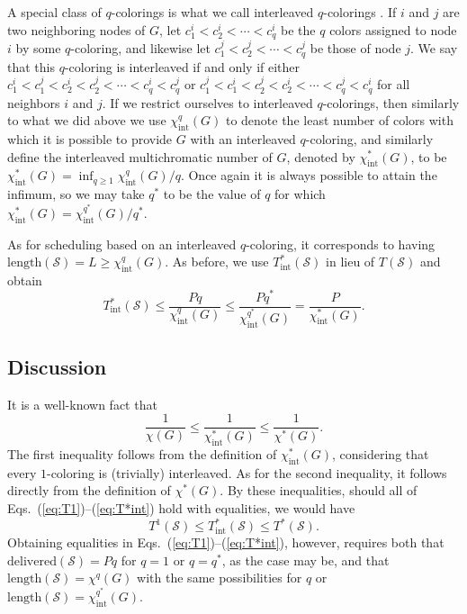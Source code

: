 \documentclass{article}
\begin{document}
A special class of $q$-colorings is what we call interleaved $q$-colorings
\cite{bg89,b00,yz05}. If $i$ and $j$ are two neighboring nodes of $G$, let
$c^i_1<c^i_2<\cdots<c^i_q$ be the $q$ colors assigned to node $i$ by some
$q$-coloring, and likewise let $c^j_1<c^j_2<\cdots<c^j_q$ be those of node $j$.
We say that this $q$-coloring is interleaved if and only if either
$c^i_1<c^j_1<c^i_2<c^j_2<\cdots<c^i_q<c^j_q$ or
$c^j_1<c^i_1<c^j_2<c^i_2<\cdots<c^j_q<c^i_q$ for all neighbors $i$ and $j$. If
we restrict ourselves to interleaved $q$-colorings, then similarly to what we
did above we use $\chi^q_\mathrm{int}(G)$ to denote the least number of colors
with which it is possible to provide $G$ with an interleaved $q$-coloring, and
similarly define the interleaved multichromatic number of $G$, denoted by
$\chi^*_\mathrm{int}(G)$, to be
$\chi^*_\mathrm{int}(G)=\inf_{q\ge 1}\chi^q_\mathrm{int}(G)/q$. Once again it is
always possible to attain the infimum, so we may take $q^*$ to be the value of
$q$ for which $\chi^*_\mathrm{int}(G)=\chi^{q^*}_\mathrm{int}(G)/q^*$.

As for scheduling based on an interleaved $q$-coloring, it corresponds to having
$\mathrm{length}(\mathcal{S})=L\ge\chi^q_\mathrm{int}(G)$. As before, we use
$T^*_\mathrm{int}(\mathcal{S})$ in lieu of $T(\mathcal{S})$ and obtain
\begin{equation}
T^*_\mathrm{int}(\mathcal{S})\le
\frac{Pq}{\chi^q_\mathrm{int}(G)}\le
\frac{Pq^*}{\chi^{q^*}_\mathrm{int}(G)}=
\frac{P}{\chi^*_\mathrm{int}(G)}.
\label{eq:T*int}
\end{equation}

\subsection{Discussion}

It is a well-known fact that
\begin{equation}
\frac{1}{\chi(G)}\le
\frac{1}{\chi^*_\mathrm{int}(G)}\le
\frac{1}{\chi^*(G)}.
\label{eq:ineq-chi}
\end{equation}
The first inequality follows from the definition of $\chi^*_\mathrm{int}(G)$,
considering that every $1$-coloring is (trivially) interleaved. As for the
second inequality, it follows directly from the definition of $\chi^*(G)$. By
these inequalities, should all of Eqs.~(\ref{eq:T1})--(\ref{eq:T*int}) hold with
equalities, we would have
\begin{equation}
T^1(\mathcal{S})\le
T^*_\mathrm{int}(\mathcal{S})\le
T^*(\mathcal{S}).
\end{equation}
Obtaining equalities in Eqs.~(\ref{eq:T1})--(\ref{eq:T*int}), however, requires
both that $\mathrm{delivered}(\mathcal{S})=Pq$ for $q=1$ or $q=q^*$, as the
case may be, and that $\mathrm{length}(\mathcal{S})=\chi^q(G)$ with the same
possibilities for $q$ or
$\mathrm{length}(\mathcal{S})=\chi^{q^*}_\mathrm{int}(G)$.
\end{document}
